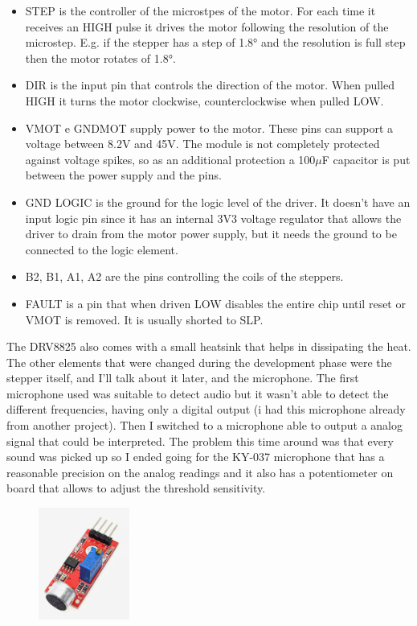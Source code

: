 \documentclass[a4paper,12pt]{article}
\begin{document}
\begin{multicols}{2}
\begin{itemize}
    \item STEP is the controller of the microstpes of the motor. For each time it receives an HIGH pulse it drives the motor following the resolution of the microstep. E.g. if the stepper has a step of 1.8° and the resolution is full step then the motor rotates of 1.8°.
    \item DIR is the input pin that controls the direction of the motor. When pulled HIGH it turns the motor clockwise, counterclockwise when pulled LOW.
    \item VMOT e GNDMOT supply power to the motor. These pins can support a voltage between 8.2V and 45V. The module is not completely protected against voltage spikes, so as an additional protection a 100$\mu$F capacitor is put between the power supply and the pins.
    \item GND LOGIC is the ground for the logic level of the driver. It doesn't have an input logic pin since it has an internal 3V3 voltage regulator that allows the driver to drain from the motor power supply, but it needs the ground to be connected to the logic element.
    \item B2, B1, A1, A2 are the pins controlling the coils of the steppers.
    \item FAULT is a pin that when driven LOW disables the entire chip until reset or VMOT is removed. It is usually shorted to SLP.
\end{itemize}
The DRV8825 also comes with a small heatsink that helps in dissipating the heat.\\
The other elements that were changed during the development phase were the stepper itself, and I'll talk about it later, and the microphone. The first microphone used was suitable to detect audio but it wasn't able to detect the different frequencies, having only a digital output (i had this microphone already from another project). Then I switched to a microphone able to output a analog signal that could be interpreted. The problem this time around was that every sound was picked up so I ended going for the KY-037 microphone that has a reasonable precision on the analog readings and it also has a potentiometer on board that allows to adjust the threshold sensitivity.\\
\begin{figure}[H]
    \begin{center}
        \includegraphics[width=3cm]{images/ky-037.PNG}

\end{center}
\end{figure}
\end{multicols}
\end{document}
